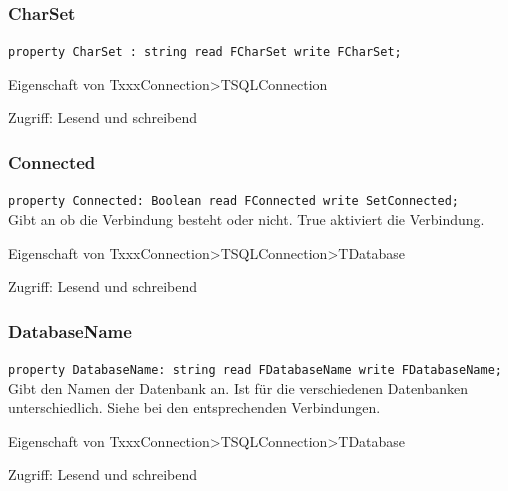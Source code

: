 \subsubsection{CharSet}
\begin{description}
  \item \texttt{property CharSet : string read FCharSet write FCharSet;}\\
  \begin{description}
    \item Eigenschaft von TxxxConnection>TSQLConnection
  \end{description}
  \begin{description}
    \item Zugriff: Lesend und schreibend
  \end{description}
\end{description}

\subsubsection{Connected}
\begin{description}
  \item \texttt{property Connected: Boolean read FConnected write SetConnected;}\\Gibt an ob die Verbindung besteht oder nicht. True aktiviert die Verbindung.
  \begin{description}
    \item Eigenschaft von TxxxConnection>TSQLConnection>TDatabase
  \end{description}
  \begin{description}
    \item Zugriff: Lesend und schreibend
  \end{description}
\end{description}

\subsubsection{DatabaseName}
\begin{description}
  \item \texttt{property DatabaseName: string read FDatabaseName write FDatabaseName;}\\Gibt den Namen der Datenbank an. Ist für die verschiedenen Datenbanken unterschiedlich. Siehe bei den entsprechenden Verbindungen.
  \begin{description}
    \item Eigenschaft von TxxxConnection>TSQLConnection>TDatabase
  \end{description}
  \begin{description}
    \item Zugriff: Lesend und schreibend
  \end{description}
\end{description}

